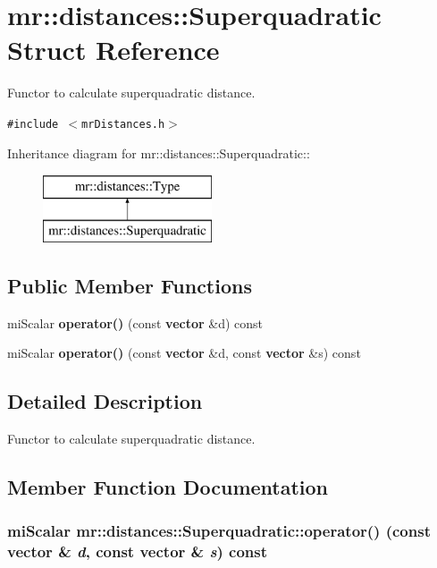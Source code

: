 \section{mr::distances::Superquadratic Struct Reference}
\label{structmr_1_1distances_1_1Superquadratic}
Functor to calculate superquadratic distance.  


{\tt \#include $<$mr\-Distances.h$>$}

Inheritance diagram for mr::distances::Superquadratic::\begin{figure}[H]
\begin{center}
\leavevmode
\includegraphics[height=2cm]{structmr_1_1distances_1_1Superquadratic}
\end{center}
\end{figure}
\subsection*{Public Member Functions}
\begin{CompactItemize}
\item 
mi\-Scalar {\bf operator()} (const {\bf vector} \&d) const 
\item 
mi\-Scalar {\bf operator()} (const {\bf vector} \&d, const {\bf vector} \&s) const 
\end{CompactItemize}


\subsection{Detailed Description}
Functor to calculate superquadratic distance. 



\subsection{Member Function Documentation}
\subsubsection{\setlength{\rightskip}{0pt plus 5cm}mi\-Scalar mr::distances::Superquadratic::operator() (const {\bf vector} \& {\em d}, const {\bf vector} \& {\em s}) const\hspace{0.3cm}{\tt  [inline, virtual]}}\label{structmr_1_1distances_1_1Superquadratic_a1}





